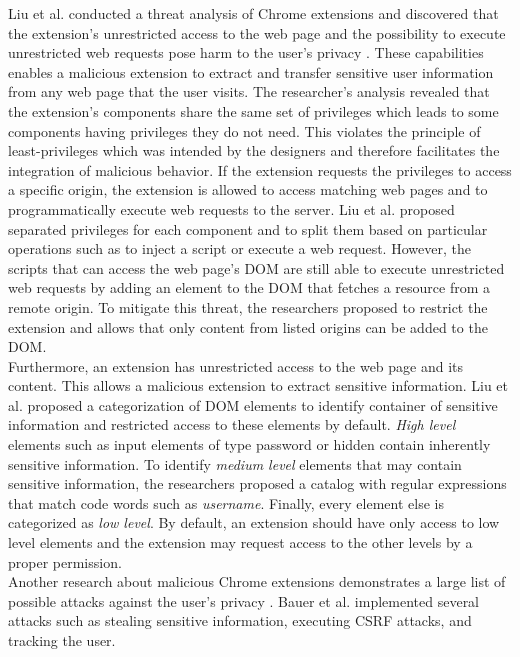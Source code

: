 	Liu et al. conducted a threat analysis of Chrome extensions and discovered that the extension's unrestricted access to the web page and the possibility to execute unrestricted web requests pose harm to the user's privacy \cite{Liu12chromeextensions:}. These capabilities enables a malicious extension to extract and transfer sensitive user information from any web page that the user visits. The researcher's analysis revealed that the extension's components share the same set of privileges which leads to some components having privileges they do not need. This violates the principle of least-privileges which was intended by the designers and therefore facilitates the integration of malicious behavior. 
	If the extension requests the privileges to access a specific origin, the extension is allowed to access matching web pages and to programmatically execute web requests to the server. Liu et al. proposed separated privileges for each component and to split them based on particular operations such as to inject a script or execute a web request. However, the scripts that can access the web page's DOM are still able to execute unrestricted web requests by adding an element to the DOM that fetches a resource from a remote origin. To mitigate this threat, the researchers proposed to restrict the extension and allows that only content from listed origins can be added to the DOM. \\
	Furthermore, an extension has unrestricted access to the web page and its content. This allows a malicious extension to extract sensitive information. Liu et al. proposed a categorization of DOM elements to identify container of sensitive information and restricted access to these elements by default. \textit{High level} elements such as input elements of type password or hidden contain inherently sensitive information. To identify \textit{medium level} elements that may contain sensitive information, the researchers proposed a catalog with regular expressions that match code words such as \textit{username}. Finally, every element else is categorized as \textit{low level}. By default, an extension should have only access to low level elements and the extension may request access to the other levels by a proper permission. \\
 	
	Another research about malicious Chrome extensions demonstrates a large list of possible attacks against the user's privacy \cite{extensions:cns14}. Bauer et al. implemented several attacks such as stealing sensitive information, executing CSRF attacks, and tracking the user. 
	 
